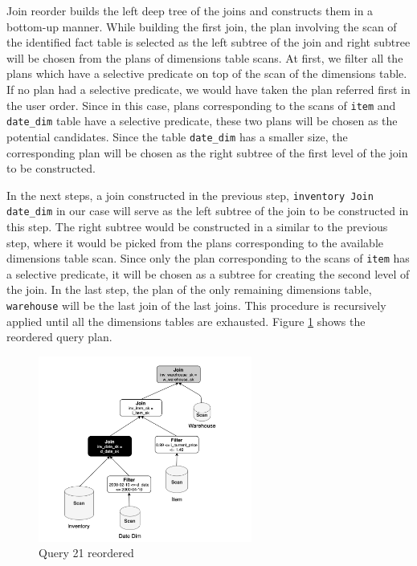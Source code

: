 Join reorder builds the left deep tree of the joins and constructs them in a bottom-up manner. While building the first join, the plan involving the scan of the identified fact table is selected as the left subtree of the join and right subtree will be chosen from the plans of dimensions table scans. At first, we filter all the plans which have a selective predicate on top of the scan of the dimensions table. If no plan had a selective predicate, we would have taken the plan referred first in the user order. Since in this case, plans corresponding to the scans of \texttt{item} and \texttt{date\_dim} table have a selective predicate, these two plans will be chosen as the potential candidates. Since the table \texttt{date\_dim} has a smaller size, the corresponding plan will be chosen as the right subtree of the first level of the join to be constructed.

In the next steps, a join constructed in the previous step, \texttt{inventory Join date\_dim} in our case will serve as the left subtree of the join to be constructed in this step. The right subtree would be constructed in a similar to the previous step, where it would be picked from the plans corresponding to the available dimensions table scan. Since only the plan corresponding to the scans of \texttt{item} has a selective predicate, it will be chosen as a subtree for creating the second level of the join. In the last step, the plan of the only remaining dimensions table, \texttt{warehouse} will be the last join of the last joins. This procedure is recursively applied until all the dimensions tables are exhausted. Figure \ref{with-reorder} shows the reordered query plan.

\begin{figure}[ht]
\centerline{\includegraphics[width=7cm]{fig/with-reorder.png}}
\caption{Query 21 reordered}
\label{with-reorder}
\end{figure}